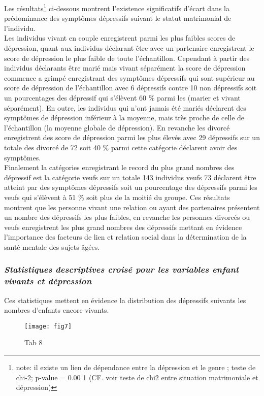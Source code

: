 \documentclass[a4paper]{article}
\begin{document}
Les résultats\footnote{note: il existe un lien de dépendance entre la dépression et le genre ; teste de chi-2; p-value = 0.00 1 (CF. voir teste de chi2 entre situation matrimoniale et dépression)} ci-dessous montrent l'existence significatifs d’écart dans la prédominance des symptômes dépressifs suivant le statut matrimonial de l’individu.\\
Les individus vivant en couple enregistrent parmi les plus faibles scores de dépression, quant aux individus déclarant être avec un partenaire enregistrent le score de dépression le plus faible de toute l’échantillon. Cependant à partir  des individus déclarants être marié mais vivant séparément la score de dépression commence a grimpé enregistrant des symptômes dépressifs qui sont supérieur au score de dépression de l’échantillon avec 6 dépressifs contre 10 non dépressifs soit  un pourcentages des dépressif qui s’élèvent 60 \%  parmi les   (marier et vivant séparément). En outre, les individus qui n’ont jamais été mariés déclarent des symptômes de dépression inférieur à la moyenne, mais très proche de celle de l’échantillon (la moyenne globale de dépression). En revanche les divorcé enregistrent des score de dépression parmi les plus élevés avec 29 dépressifs sur un totale des divorcé de 72 soit 40 \% parmi cette catégorie déclarent avoir des symptômes.\\
Finalement la catégories enregistrant le record du plus grand nombres  des dépressif est la catégorie veufs  sur un totale 143 individus veufs 73 déclarent être atteint par des symptômes dépressifs soit un pourcentage des dépressifs parmi les veufs qui s’élèvent à 51 \% soit plus de la moitié du groupe. Ces résultats montrent que les personne vivant une relation ou ayant des partenaires présentent un nombre des dépressifs les plus faibles, en revanche les personnes divorcés ou veufs enregistrent les plus grand nombres des dépressifs mettant en évidence l’importance des facteurs de lien et relation social dans la détermination de la santé mentale des sujets âgées.\\

\subsubsection{\textit{Statistiques descriptives croisé pour les variables enfant vivants et dépression }}
Ces statistiques mettent en évidence la distribution des dépressifs suivants les nombres d’enfants encore vivants.
\begin{figure}[h!]
	\centering
	\texttt{[image: fig7]}
	\caption{Tab 8}
	\label{ enfant vivants et dépression}
\end{figure}
\end{document}
